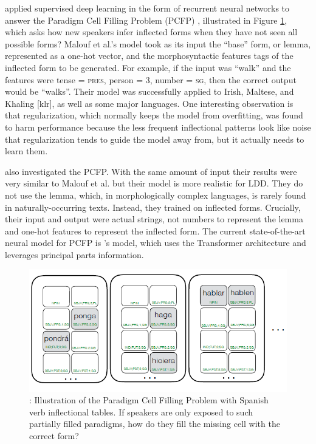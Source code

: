 \documentclass[12pt]{article}
\begin{document}
 applied supervised deep learning in the form of recurrent neural networks to answer the Paradigm Cell Filling Problem (PCFP) \cite{Ackerman_partsand}, illustrated in Figure \ref{fig:PCFP}, which asks how new speakers infer inflected forms when they have not seen all possible forms? Malouf et al.'s model took as its input the ``base'' form, or lemma, represented as a one-hot vector, and the morphosyntactic features tags of the inflected form to be generated. For example, if the input was ``walk'' and the features were tense = \textsc{pres}, person = \textsc{3}, number = \textsc{sg}, then the correct output would be ``walks''. Their model was successfully applied to Irish, Maltese, and Khaling [klr], as well as some major languages. One interesting observation is that regularization, which normally keeps the model from overfitting, was found to harm performance because the less frequent inflectional patterns look like noise that regularization tends to guide the model away from, but it actually needs to learn them. 

 also investigated the PCFP. With the same amount of input their results were very similar to Malouf et al. but their model is more realistic for LDD. They do not use the lemma, which, in morphologically complex languages, is rarely found in naturally-occurring texts. Instead, they trained on inflected forms. Crucially, their input and output were actual strings, not numbers to represent the lemma and one-hot features to represent the inflected form. 
The current state-of-the-art neural model for PCFP is 's model, which uses the Transformer architecture and leverages principal parts information.

\begin{figure}[t]
\begin{center}
\includegraphics[width=0.9\columnwidth]{PCFP.PNG}
\caption{: Illustration of the Paradigm Cell Filling Problem with Spanish verb inflectional tables. If speakers are only exposed to such partially filled paradigms, how do they fill the missing cell with the correct form?}
\label{fig:PCFP}
\end{center}
\end{figure}
\end{document}
